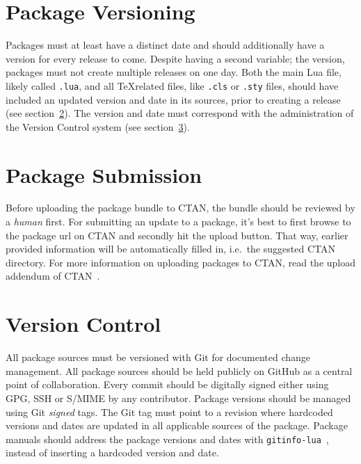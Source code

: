 \documentclass{xdpdoc}
\begin{document}
\begin{multicols}{2}
        \section{Package Versioning}

        Packages must at least have a distinct date and should additionally have a version for every release to come.
        Despite having a second variable; the version, packages must not create multiple releases on one day.
        Both the main Lua file, likely called \texttt{.lua}, and all \TeX related files, like \texttt{.cls} or \texttt{.sty} files, should have included an updated version and date in its sources, prior to creating a release (see section~\ref{sec:submission}).
        The version and date must correspond with the administration of the Version Control system (see section~\ref{sec:git}).


        \section{Package Submission}\label{sec:submission}

        Before uploading the package bundle to CTAN, the bundle should be reviewed by a \textit{human} first.
        For submitting an update to a package, it's best to first browse to the package url on CTAN and secondly hit the upload button.
        That way, earlier provided information will be automatically filled in, i.e.\ the suggested CTAN directory.
        For more information on uploading packages to CTAN, read the upload addendum of CTAN~\cite{ctan:help:addendum}.


        \section{Version Control}\label{sec:git}

        All package sources must be versioned with Git for documented change management.
        All package sources should be held publicly on GitHub as a central point of collaboration.
        Every commit should be digitally signed either using GPG, SSH or S/MIME by any contributor.
        Package versions should be managed using Git \textit{signed} tags.
        The Git tag must point to a revision where hardcoded versions and dates are updated in all applicable sources of the package.
        Package manuals should address the package versions and dates with \texttt{gitinfo-lua}~\cite{gitinfo-lua}, instead of inserting a hardcoded version and date.



\end{multicols}
\end{document}
